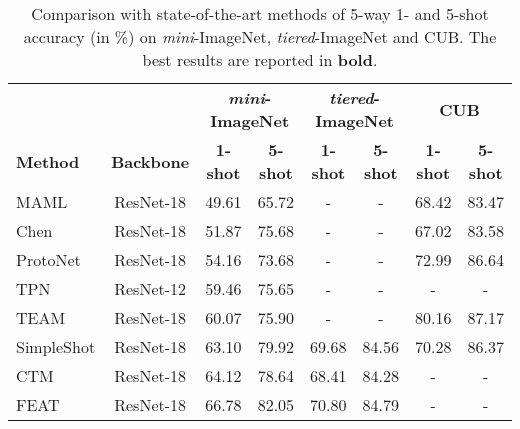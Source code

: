 \documentclass{article}
\begin{document}
\begin{table*}[t]
\begin{small}
		\caption{Comparison with state-of-the-art methods of 5-way 1- and 5-shot accuracy (in \%) on \textit{mini}-ImageNet, \textit{tiered}-ImageNet and CUB. The best results are reported in \textbf{bold}.}
		\label{table:sota}
		\begin{center}
			\begin{tabular}{lccccccc}
				& \textbf{}         & \multicolumn{2}{c}{\textbf{\textit{mini}-ImageNet}} & \multicolumn{2}{c}{\textbf{\textit{tiered}-ImageNet}} & \multicolumn{2}{c}{\textbf{CUB}}  \\
				\textbf{Method}                           & \textbf{Backbone} & \textbf{1-shot}      & \textbf{5-shot}     & \textbf{1-shot}       & \textbf{5-shot}      & \textbf{1-shot} & \textbf{5-shot} \\ \hline
				MAML \cite{MAML}                          & ResNet-18         & 49.61                & 65.72               & -                     & -                    & 68.42           & 83.47           \\
				Chen \cite{Chen19}                        & ResNet-18         & 51.87                & 75.68               & -                     & -                    & 67.02           & 83.58           \\
				ProtoNet \cite{ProtoNet}                  & ResNet-18         & 54.16                & 73.68               & -                     & -                    & 72.99           & 86.64           \\
				TPN \cite{TPN}                            & ResNet-12         & 59.46                & 75.65               & -                     & -                    & -               & -               \\
				TEAM \cite{Team}                          & ResNet-18         & 60.07                & 75.90               & -                     & -                    & 80.16           & 87.17           \\
				SimpleShot \cite{SimpleShot}              & ResNet-18         & 63.10                & 79.92               & 69.68                 & 84.56                & 70.28           & 86.37           \\
				CTM \cite{CTM}                            & ResNet-18         & 64.12                & 78.64               & 68.41                 & 84.28                & -               & -               \\
				FEAT \cite{FEAT}                          & ResNet-18         & 66.78                & 82.05               & 70.80                 & 84.79                & -               & -               \\

\end{tabular}
\end{center}
\end{small}
\end{table*}
\end{document}
